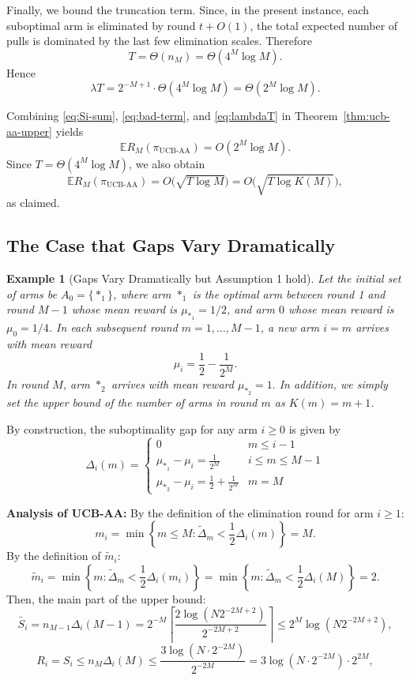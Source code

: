 \documentclass[11pt]{article}
\newtheorem{example}{Example}
\begin{document}
Finally, we bound the truncation term. Since, in the present instance, each suboptimal arm
is eliminated by round $t+O(1)$, the total expected number of pulls is dominated by the last
few elimination scales. Therefore
\[
T=\Theta(n_M)=\Theta(4^M\log M).
\]
Hence
\begin{equation}
\label{eq:lambdaT}
\lambda T
=
2^{-M+1}\cdot \Theta(4^M\log M)
=
\Theta(2^M\log M).
\end{equation}

Combining \eqref{eq:Si-sum}, \eqref{eq:bad-term}, and \eqref{eq:lambdaT} in
Theorem~\ref{thm:ucb-aa-upper} yields
\[
\mathbb{E}R_M(\pi_{\mathrm{UCB\text{-}AA}})
=
O(2^M\log M).
\]
Since $T=\Theta(4^M\log M)$, we also obtain
\[
\mathbb{E}R_M(\pi_{\mathrm{UCB\text{-}AA}})
=
O\bigl(\sqrt{T\log M}\bigr)
=
O\bigl(\sqrt{T\log K(M)}\bigr),
\]
as claimed.



\subsection{The Case that Gaps Vary Dramatically}\label{sec:The Case that Gaps Vary Dramatically}


\begin{example}[Gaps Vary Dramatically but Assumption 1 hold]
\label{Example 4}
Let the initial set of arms be $A_0 = \{*_1\}$, where arm $*_1$ is the optimal arm between round 1 and round $M-1$ whose mean reward is $\mu_{*_1} = 1/2$, and arm $0$ whose mean reward is $\mu_0 = 1/4$. In each subsequent round $m=1, \dots, M-1$, a new arm $i=m$ arrives with mean reward 
$$\mu_i = \frac{1}{2} - \frac{1}{2^{M}}.$$ In round $M$, arm $*_2$ arrives with mean reward $\mu_{*_2} =1.$
In addition, we simply set the upper bound of the number of arms in round $m$ as $K(m)=m+1$.
\end{example}

By construction, the suboptimality gap for any arm $i \ge 0$ is given by 
\[\Delta_i(m)=\begin{cases}
      0        & m\leq i-1\\
    \mu_{*_1} - \mu_i = \frac{1}{2^{M}}  & i\leq m\leq M-1\\
    \mu_{*_2} - \mu_i = \frac{1}{2} +\frac{1}{2^{M}}&m=M 
\end{cases}\]


\textbf{Analysis of UCB-AA:} 
By the definition of the elimination round for arm $i \geq1$:
$$m_i = \min \left\{ m \leq M : \tilde{\Delta}_m < \frac{1}{2}\Delta_i(m) \right\}=M.$$
By the definition of $\tilde{m}_i$:
$$ \tilde{m}_{i} = \min\left\{ m: \tilde{\Delta}_{m} < \frac{1}{2}\Delta_{i}(m_i) \right\}=\min\left\{ m: \tilde{\Delta}_{m} < \frac{1}{2}\Delta_{i}(M) \right\}=2.$$
Then, the main part of the upper bound: 
$$\tilde{S_i}=n_{M-1}\Delta_i(M-1)= 2^{-M} \left\lceil \frac{2 \log(N 2^{-2M+2})}{2^{-2M+2}} \right\rceil  \leq 2^{M} \log(N 2^{-2M+2}),$$
$$R_i=S_i\leq n_{M} \Delta_i(M) \le  \frac{3 \log (N \cdot 2^{-2M})}{2^{-2M} }  =3\log (N \cdot 2^{-2M}) \cdot 2^{2M}, $$
\end{document}
